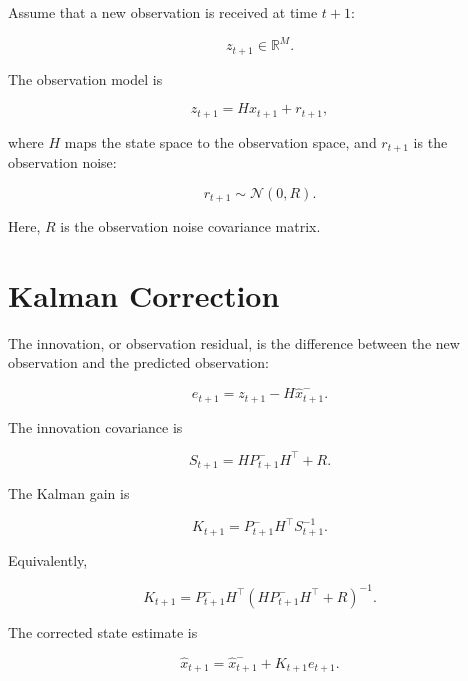 \documentclass[a4paper]{article}
\begin{document}
        Assume that a new observation is received at time \(t+1\):
        
        \[
            z_{t+1}
            \in
            \mathbb{R}^{M}.
        \]
        
        The observation model is
        
        \[
            z_{t+1}
            =
            Hx_{t+1}
            +
            r_{t+1},
        \]
        
        where \(H\) maps the state space to the observation space, and \(r_{t+1}\) is the observation noise:
        
        \[
            r_{t+1}
            \sim
            \mathcal{N}
            \left(
                0,
                R
            \right).
        \]
        
        Here, \(R\) is the observation noise covariance matrix.
    
    
    \section{Kalman Correction}
        
        The innovation, or observation residual, is the difference between the new observation and the predicted observation:
        
        \[
            e_{t+1}
            =
            z_{t+1}
            -
            H\hat{x}_{t+1}^{-}.
        \]
        
        The innovation covariance is
        
        \[
            S_{t+1}
            =
            HP_{t+1}^{-}H^{\top}
            +
            R.
        \]
        
        The Kalman gain is
        
        \[
            K_{t+1}
            =
            P_{t+1}^{-}
            H^{\top}
            S_{t+1}^{-1}.
        \]
        
        Equivalently,
        
        \[
            K_{t+1}
            =
            P_{t+1}^{-}
            H^{\top}
            \left(
                HP_{t+1}^{-}H^{\top}
                +
                R
            \right)^{-1}.
        \]
        
        The corrected state estimate is
        
        \[
            \hat{x}_{t+1}
            =
            \hat{x}_{t+1}^{-}
            +
            K_{t+1}
            e_{t+1}.
        \]
        
\end{document}
